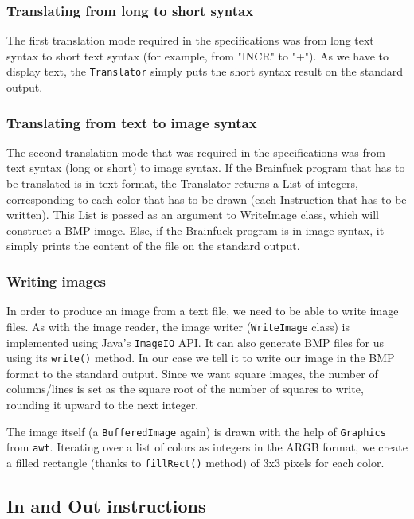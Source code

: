 \documentclass{article}
\begin{document}
\subsubsection{Translating from long to short syntax}

The first translation mode required in the specifications was from long text syntax to short text syntax (for example, from "INCR" to "+"). As we have to display text, the \texttt{Translator} simply puts the short syntax result on the standard output.

\subsubsection{Translating from text to image syntax}

The second translation mode that was required in the specifications was from text syntax (long or short) to image syntax. If the Brainfuck program that has to be translated is in text format, the Translator returns a List of integers, corresponding to each color that has to be drawn (each Instruction that has to be written). This List is passed as an argument to WriteImage class, which will construct a BMP image. Else, if the Brainfuck program is in image syntax, it simply prints the content of the file on the standard output.

\subsubsection{Writing images}

In order to produce an image from a text file, we need to be able to write image files. As with the image reader, the image writer (\texttt{WriteImage} class) is implemented using Java's \texttt{ImageIO} API. It can also generate BMP files for us using its \texttt{write()} method. In our case we tell it to write our image in the BMP format to the standard output. Since we want square images, the number of columns/lines is set as the square root of the number of squares to write, rounding it upward to the next integer.

The image itself (a \texttt{BufferedImage} again) is drawn with the help of \texttt{Graphics} from \texttt{awt}. Iterating over a list of colors as integers in the ARGB format, we create a filled rectangle (thanks to \texttt{fillRect()} method) of 3x3 pixels for each color.

\subsection{In and Out instructions}
\end{document}
